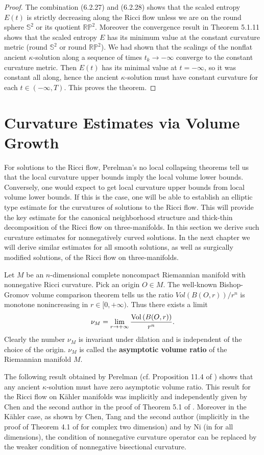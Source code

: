 \begin{proof}
The combination (6.2.27) and (6.2.28) shows that the scaled
entropy $E(t)$ is strictly decreasing along the Ricci flow unless
we are on the round sphere $\mathbb{S}^2$ or its quotient
$\mathbb{R}\mathbb{P}^2$. Moreover the convergence result in
Theorem 5.1.11 shows that the scaled entropy $E$ has its minimum
value at the constant curvature metric (round $\mathbb{S}^2$ or
round $\mathbb{R}\mathbb{P}^2$). We had shown that the scalings of
the nonflat ancient $\kappa$-solution along a sequence of times
$t_k\rightarrow-\infty$ converge to the constant curvature metric.
Then $E(t)$ has its minimal value at $t=-\infty$, so it was
constant all along, hence the ancient $\kappa$-solution must have
constant curvature for each $t\in (-\infty,T)$. This proves the
theorem.
\end{proof}


\section{Curvature Estimates via Volume Growth}

For solutions to the Ricci flow, Perelman's no local collapsing
theorems tell us that the local curvature upper bounds imply the
local volume lower bounds. Conversely, one would expect to get
local curvature upper bounds from local volume lower bounds. If
this is the case, one will be able to establish an elliptic type
estimate for the curvatures of solutions to the Ricci flow. This
will provide the key estimate for the canonical neighborhood
structure and thick-thin decomposition of the Ricci flow on
three-manifolds. In this section we derive such curvature
estimates for nonnegatively curved solutions. In the next chapter
we will derive similar estimates for all smooth solutions, as well
as surgically modified solutions, of the Ricci flow on
three-manifolds.

Let $M$ be an $n$-dimensional complete noncompact Riemannian
manifold with nonnegative Ricci curvature. Pick an origin $O\in
M$. The well-known Bishop-Gromov volume comparison theorem tells
us the ratio $Vol(B(O,r))/r^n$ is monotone nonincreasing in
$r\in[0,+\infty)$. Thus there exists a limit
$$
\nu_M=\lim_{r\rightarrow+\infty}\frac{{\rm Vol}\,(B(O,r))}{r^n}.
$$
Clearly the number $\nu_M$ is invariant under dilation and is
independent of the choice of the origin. $\nu_M$ is called the
{\bf asymptotic volume ratio} of
the Riemannian manifold $M$.

The following result obtained by Perelman (cf. Proposition 11.4 of
\cite{P1}) shows that any ancient $\kappa$-solution must have zero
asymptotic volume ratio. This result for the Ricci flow on
K\"ahler manifolds was implicitly and independently given by Chen
and the second author in the proof of Theorem 5.1 of \cite{CZ04}.
Moreover in the K\"ahler case, as shown by Chen, Tang and the
second author (implicitly in the proof of Theorem 4.1 of
\cite{CTZ04} for complex two dimension) and by Ni (in \cite{Ni}
for all dimensions), the condition of nonnegative curvature
operator can be replaced by the weaker condition of nonnegative
bisectional curvature.

